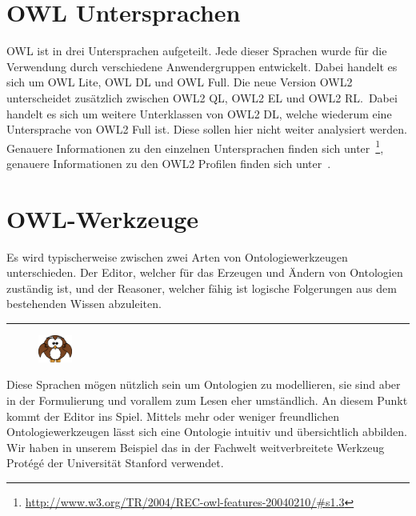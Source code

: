 \section{OWL Untersprachen}
\label{sec:owl_owl_Untersprachen}
OWL ist in drei Untersprachen aufgeteilt. Jede dieser Sprachen wurde für die Verwendung durch verschiedene Anwendergruppen entwickelt. Dabei handelt es sich um OWL Lite, OWL DL und OWL Full. Die neue Version OWL2 unterscheidet zusätzlich zwischen OWL2 QL, OWL2 EL und OWL2 RL.\ Dabei handelt es sich um weitere Unterklassen von OWL2 DL, welche wiederum eine Untersprache von OWL2 Full ist. Diese sollen hier nicht weiter analysiert werden. Genauere Informationen zu den einzelnen Untersprachen finden sich unter~\footnote{\url{http://www.w3.org/TR/2004/REC-owl-features-20040210/#s1.3}}, genauere Informationen zu den OWL2 Profilen finden sich unter~.

\section{OWL-Werkzeuge}
\label{sec:owl_owl_OwlTools}
Es wird typischerweise zwischen zwei Arten von Ontologiewerkzeugen unterschieden. Der Editor, welcher für das Erzeugen und Ändern von Ontologien zuständig ist, und der Reasoner, welcher fähig ist logische Folgerungen aus dem bestehenden Wissen abzuleiten.

\noindent\rule[1ex]{\textwidth}{1pt}
\vspace{0.1pt}
\begin{figure}
    \vspace{-8pt}
    \includegraphics[width=0.1\textwidth]{bilder/owl.png}
\end{figure}
Diese Sprachen mögen nützlich sein um Ontologien zu modellieren, sie sind aber in der Formulierung und vorallem zum Lesen eher umständlich. An diesem Punkt kommt der Editor ins Spiel. Mittels mehr oder weniger freundlichen Ontologiewerkzeugen lässt sich eine Ontologie intuitiv und übersichtlich abbilden. Wir haben in unserem Beispiel das in der Fachwelt weitverbreitete Werkzeug Protégé der Universität Stanford verwendet.


